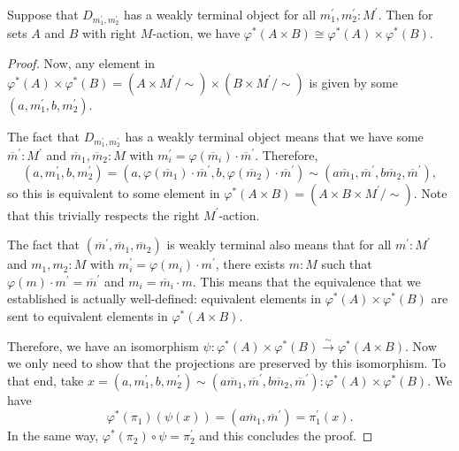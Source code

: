 \begin{lemma}\label{lem:scalar-extension-product}
  Suppose that $ D_{m^\prime_1, m^\prime_2} $ has a weakly terminal object for all $ m^\prime_1, m^\prime_2: M^\prime $. Then for sets $ A $ and $ B $ with right $ M $-action, we have $ \varphi^*(A \times B) \cong \varphi^*(A) \times \varphi^*(B) $.
\end{lemma}
\begin{proof}
  Now, any element in $ \varphi^*(A) \times \varphi^*(B) = (A \times M^\prime / \sim) \times (B \times M^\prime / \sim) $ is given by some $ (a, m^\prime_1, b, m^\prime_2) $.

  The fact that $ D_{m^\prime_1, m^\prime_2} $ has a weakly terminal object means that we have some $ \overline m^\prime: M^\prime $ and $ \overline m_1, \overline m_2: M $ with $ m_i^\prime = \varphi(\overline m_i) \cdot \overline m^\prime $. Therefore,
  \[ (a, m^\prime_1, b, m^\prime_2) = (a, \varphi(\overline m_1) \cdot \overline m^\prime, b, \varphi(\overline m_2) \cdot \overline m^\prime) \sim (a \overline m_1, \overline m^\prime, b \overline m_2, \overline m^\prime), \]
  so this is equivalent to some element in $ \varphi^*(A \times B) = (A \times B \times M^\prime / \sim) $. Note that this trivially respects the right $ M^\prime $-action.

  The fact that $ (\overline m^\prime, \overline m_1, \overline m_2) $ is weakly terminal also means that for all $ m^\prime: M^\prime $ and $ m_1, m_2: M $ with $ m_i^\prime = \varphi(m_i) \cdot m^\prime $, there exists $ m: M $ such that $ \varphi(m) \cdot m^\prime = \overline m^\prime $ and $ m_i = \overline m_i \cdot m $. This means that the equivalence that we established is actually well-defined: equivalent elements in $ \varphi^*(A) \times \varphi^*(B) $ are sent to equivalent elements in $ \varphi^*(A \times B) $.

  Therefore, we have an isomorphism $ \psi: \varphi^*(A) \times \varphi^*(B) \xrightarrow{\sim} \varphi^*(A \times B) $. Now we only need to show that the projections are preserved by this isomorphism. To that end, take $ x = (a, m^\prime_1, b, m^\prime_2) \sim (a \overline m_1, \overline m^\prime, b \overline m_2, \overline m^\prime) : \varphi^*(A) \times \varphi^*(B) $. We have
  \[ \varphi^*(\pi_1)(\psi(x)) = (a \overline m_1, \overline m^\prime) = \pi^\prime_1(x). \]
  In the same way, $ \varphi^*(\pi_2) \circ \psi = \pi^\prime_2 $ and this concludes the proof.
\end{proof}
